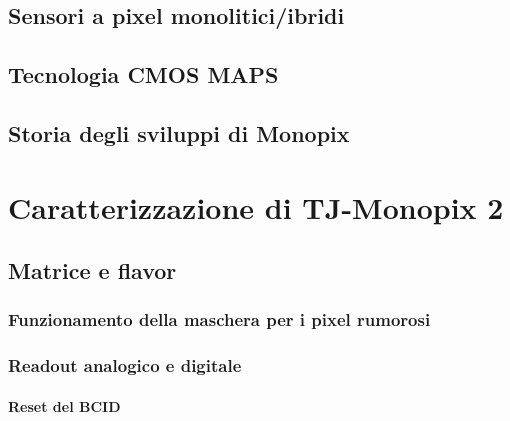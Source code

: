 \documentclass[10pt,a4paper,twoside]{report}
\begin{document}
\section{Sensori a pixel monolitici/ibridi}

\section{Tecnologia CMOS MAPS}

\begin{comment}
small fill factor /large fill factor
\end{comment}

\section{Storia degli sviluppi di Monopix}




\chapter{Caratterizzazione di TJ-Monopix 2}

\section{Matrice e flavor}

\subsection{Funzionamento della maschera per i pixel rumorosi}

\subsection{Readout analogico e digitale}

\subsubsection{Reset del BCID}
\begin{comment}
REFERENZE
\end{comment}
\end{document}
